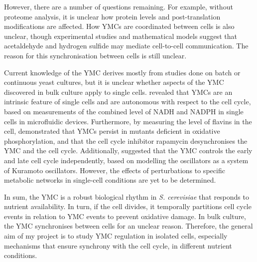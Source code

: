 However, there are a number of questions remaining.
For example, without proteome analysis, it is unclear how protein levels and post-translation modifications are affected.
How YMCs are coordinated between cells is also unclear, though experimental studies \citep{murray_regulation_2007} and mathematical models \citep{krishna_minimal_2018} suggest that acetaldehyde and hydrogen sulfide may mediate cell-to-cell communication.
The reason for this synchronisation between cells is still unclear. %

Current knowledge of the YMC derives mostly from studies done on batch or continuous yeast cultures, but it is unclear whether aspects of the YMC discovered in bulk culture apply to single cells.
\citet{papagiannakis_autonomous_2017} revealed that YMCs are an intrinsic feature of single cells and are autonomous with respect to the cell cycle, based on measurements of the combined level of NADH and NADPH in single cells in microfluidic devices.
Furthermore, by measuring the level of flavins in the cell, \citet{baumgartner_flavin-based_2018} demonstrated that YMCs persist in mutants deficient in oxidative phosphorylation, and that the cell cycle inhibitor rapamycin desynchronises the YMC and the cell cycle.
Additionally, \citet{ozsezen_inference_2019} suggested that the YMC controls the early and late cell cycle independently, based on modelling the oscillators as a system of Kuramoto oscillators.
However, the effects of perturbations to specific metabolic networks in single-cell conditions are yet to be determined.


In sum, the YMC is a robust biological rhythm in \emph{S. cerevisiae} that responds to nutrient availability.
In turn, if the cell divides, it temporally partitions cell cycle events in relation to YMC events to prevent oxidative damage.
In bulk culture, the YMC synchronises between cells for an unclear reason.
Therefore, the general aim of my project is to study YMC regulation in isolated cells, especially mechanisms that ensure synchrony with the cell cycle, in different nutrient conditions.

